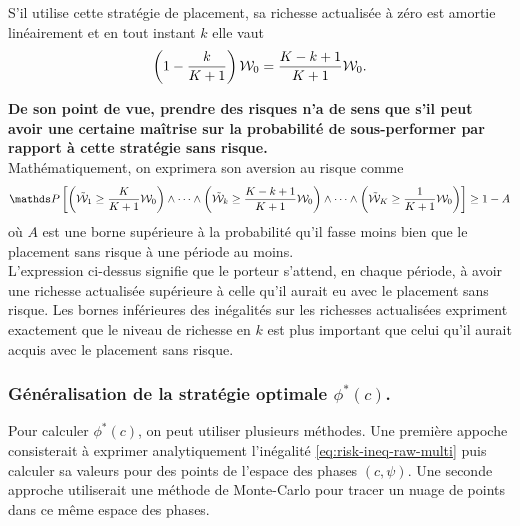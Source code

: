 \documentclass{article}
\numberwithin{equation}{section}
\begin{document}
S'il utilise cette stratégie de placement, sa richesse actualisée à zéro est amortie linéairement et en tout instant $k$ elle vaut
\begin{equation}
\left( 1 - \frac{k}{K + 1}\right)\mathcal{W}_0 =\frac{K - k + 1}{K + 1}\mathcal{W}_0.
\end{equation}

\textbf{\color{awesomePurple}De son point de vue, prendre des risques n'a de sens que s'il peut avoir une certaine maîtrise sur la probabilité de sous-performer par rapport à cette stratégie sans risque.}\\

Mathématiquement, on exprimera son aversion au risque comme
\begin{equation}\label{eq:risk-ineq-raw-multi}
\mathds P\left[ \left(\tilde\W_1\geq\frac{K}{K + 1}\W_0\right)\wedge \dots\wedge \left(\tilde\W_k\geq\frac{K - k + 1}{K + 1}\W_0\right)\wedge \dots\wedge \left(\tilde\W_K\geq\frac{1}{K + 1}\W_0\right) \right] \geq 1 - A
\end{equation}
où $A$ est une borne supérieure à la probabilité qu'il fasse moins bien que le placement sans risque à une période au moins.\\

L'expression ci-dessus signifie que le porteur s'attend, en chaque période, à avoir une richesse actualisée supérieure à celle qu'il aurait eu avec le placement sans risque. Les bornes inférieures des inégalités sur les richesses actualisées expriment exactement que le niveau de richesse en $k$ est plus important que celui qu'il aurait acquis avec le placement sans risque.

\subsubsection{Généralisation de la stratégie optimale $\phi^*(c)$.}

Pour calculer $\phi^*(c)$, on peut utiliser plusieurs méthodes. Une première appoche consisterait à exprimer analytiquement l'inégalité \eqref{eq:risk-ineq-raw-multi} puis calculer sa valeurs pour des points de l'espace des phases $(c, \psi)$. Une seconde approche utiliserait une méthode de Monte-Carlo pour tracer un nuage de points dans ce même espace des phases.
\end{document}

